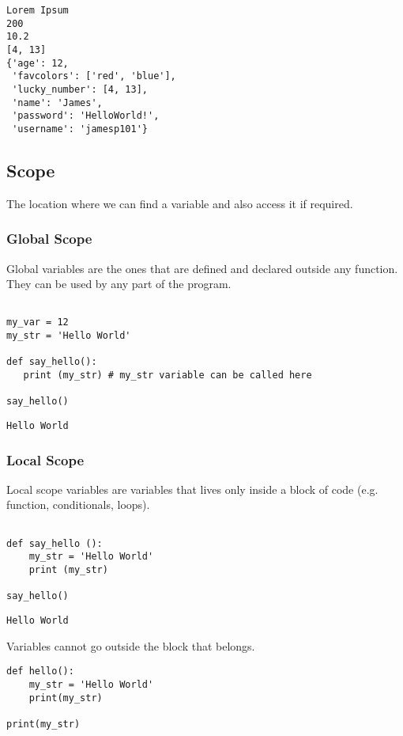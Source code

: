 \documentclass[11pt]{article}
\begin{document}
\begin{verbatim}
Lorem Ipsum
200
10.2
[4, 13]
{'age': 12,
 'favcolors': ['red', 'blue'],
 'lucky_number': [4, 13],
 'name': 'James',
 'password': 'HelloWorld!',
 'username': 'jamesp101'}
\end{verbatim}
\subsection{Scope}
\label{sec:orgf05980f}
The location where we can find a variable and also access it if required.

\subsubsection{Global Scope}
\label{sec:orgf644d51}
Global variables are the ones that are defined and declared outside any function. They can be used by any part of the program.
\begin{verbatim}

my_var = 12
my_str = 'Hello World'

def say_hello():
   print (my_str) # my_str variable can be called here

say_hello()
\end{verbatim}

\begin{verbatim}
Hello World
\end{verbatim}

\subsubsection{Local Scope}
\label{sec:orgb4f2e19}
Local scope variables are variables that lives only inside a block of code (e.g. function, conditionals, loops).

\begin{verbatim}

def say_hello ():
    my_str = 'Hello World'
    print (my_str)

say_hello()
\end{verbatim}

\begin{verbatim}
Hello World
\end{verbatim}


Variables cannot go outside the block that belongs.

\begin{verbatim}
def hello():
    my_str = 'Hello World'
    print(my_str)

print(my_str)
\end{verbatim}
\end{document}
